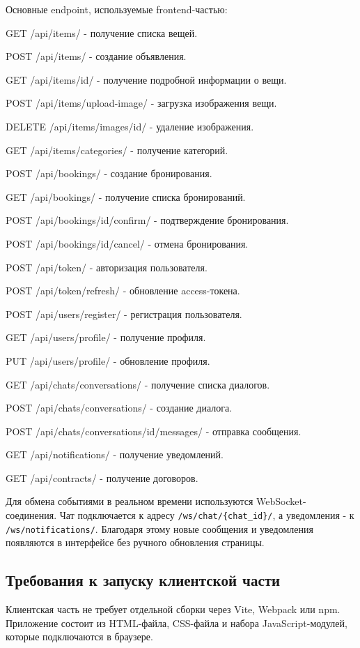 Основные endpoint, используемые frontend-частью:

GET /api/items/ - получение списка вещей.

POST /api/items/ - создание объявления.

GET /api/items/{id}/ - получение подробной информации о вещи.

POST /api/items/upload-image/ - загрузка изображения вещи.

DELETE /api/items/images/{id}/ - удаление изображения.

GET /api/items/categories/ - получение категорий.

POST /api/bookings/ - создание бронирования.

GET /api/bookings/ - получение списка бронирований.

POST /api/bookings/{id}/confirm/ - подтверждение бронирования.

POST /api/bookings/{id}/cancel/ - отмена бронирования.

POST /api/token/ - авторизация пользователя.

POST /api/token/refresh/ - обновление access-токена.

POST /api/users/register/ - регистрация пользователя.

GET /api/users/profile/ - получение профиля.

PUT /api/users/profile/ - обновление профиля.

GET /api/chats/conversations/ - получение списка диалогов.

POST /api/chats/conversations/ - создание диалога.

POST /api/chats/conversations/{id}/messages/ - отправка сообщения.

GET /api/notifications/ - получение уведомлений.

GET /api/contracts/ - получение договоров.

Для обмена событиями в реальном времени используются WebSocket-соединения. Чат подключается к адресу \texttt{/ws/chat/\{chat\_id\}/}, а уведомления - к \texttt{/ws/notifications/}. Благодаря этому новые сообщения и уведомления появляются в интерфейсе без ручного обновления страницы.

\subsection{Требования к запуску клиентской части}

Клиентская часть не требует отдельной сборки через Vite, Webpack или npm. Приложение состоит из HTML-файла, CSS-файла и набора JavaScript-модулей, которые подключаются в браузере.

